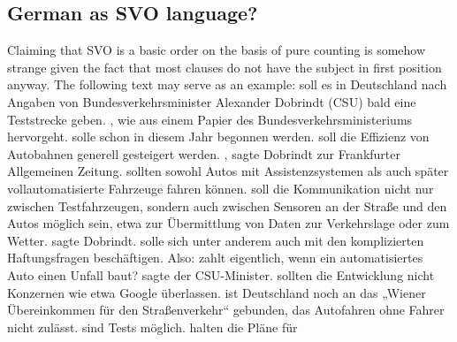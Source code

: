 

\subsection{German as SVO language?}

Claiming that SVO is a basic order on the basis of pure counting is somehow strange given the
fact that most  clauses do not have the subject in first position anyway. The following text
may serve as an example:
\eanoraggedright
{} soll es in Deutschland nach Angaben von Bundes\-ver\-kehrs\-mi\-nis\-ter
Alexander Dobrindt (CSU) bald eine Teststrecke geben.  , wie aus einem Papier des
Bundesverkehrsministeriums hervorgeht. 
solle schon in diesem Jahr begonnen werden.  soll die Effizienz von
Autobahnen generell gesteigert werden. , sagte Dobrindt zur Frankfurter
Allgemeinen Zeitung.   sollten sowohl Autos mit Assistenzsystemen als auch
später vollautomatisierte Fahrzeuge fahren können.  soll die Kommunikation nicht nur
zwischen Testfahrzeugen, sondern auch zwi\-schen Sensoren an der Straße und den Autos möglich sein,
etwa zur Übermittlung von Daten zur Verkehrslage oder zum Wetter.  sagte Dobrindt.  solle sich unter anderem auch mit den
komplizierten Haftungsfragen beschäftigen.  Also:  zahlt eigentlich, wenn ein
automatisiertes Auto einen Unfall baut?   sagte der
CSU-Minister.  sollten die Entwicklung nicht Konzernen wie etwa
Google überlassen.   ist Deutschland noch an das „Wiener Über\-ein\-kom\-men für den
Straßenverkehr“ gebunden, das Autofahren ohne Fahrer nicht zulässt.  sind Tests möglich.   halten die Pläne für
